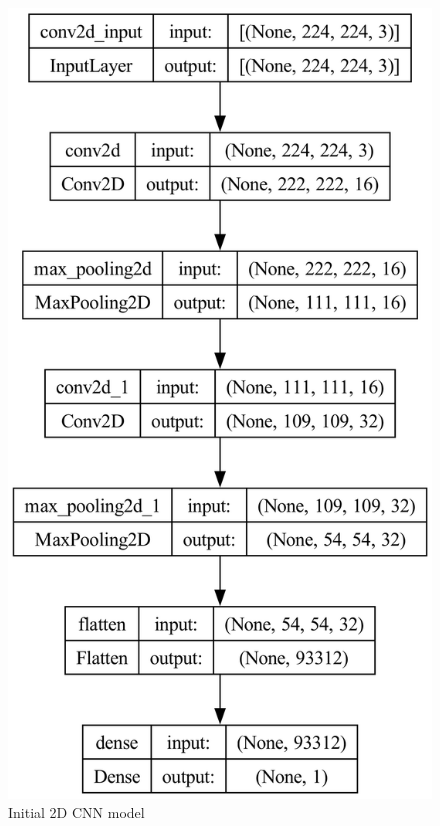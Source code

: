 \begin{figure}[]
    \centering
    \includegraphics[scale=0.2]{images/simple3.png}
    \caption{Initial 2D CNN model}
    \label{fig:First2DCNN}
\end{figure}

